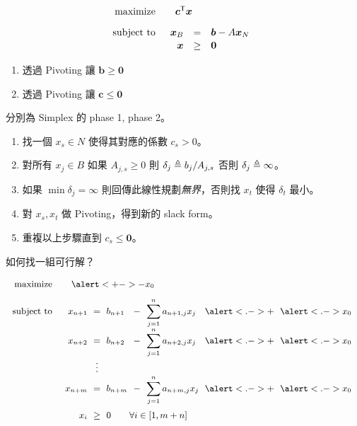 \documentclass[standalone]{beamer}
\begin{document}
\begin{frame}{}
\[
\linearprog{\bm{c}^\mathsf{T} \bm{x}}{
  \begin{array}[t]{rcl}
    \bm{x}_B & = & \bm{b} - A \bm{x}_N \\
    \bm{x}  & \geq & \bm{0}
  \end{array}
}
\]
\pause
\begin{enumerate}[<+->]
  \item 透過 Pivoting 讓 $\bm{b} \geq \bm{0}$
  \item 透過 Pivoting 讓 $\bm{c} \leq \bm{0}$
\end{enumerate}

\onslide<+->
分別為 Simplex 的 phase 1, phase 2。
\end{frame}

\begin{frame}{}
\begin{enumerate}[<+->]
  \itemsep=1ex
  \item 找一個 $x_s \in N$ 使得其對應的係數 $c_s > 0$。
  \item 對所有 $x_j \in B$ 如果 $A_{j, s} \geq 0$ 則 $\delta_j \triangleq b_j / A_{j, s}$ 否則 $\delta_j \triangleq \infty$。
  \item 如果 $\min \delta_j = \infty$ 則回傳此線性規劃\emph{無界}，否則找 $x_t$ 使得 $\delta_t$ 最小。
  \item 對 $x_s, x_t$ 做 Pivoting，得到新的 slack form。
  \item 重複以上步驟直到 $c_s \leq \bm{0}$。
\end{enumerate}
\bigskip

\end{frame}

\begin{frame}{}
  如何找一組可行解？
  \pause

  \[
    \small
    \linearprog{\alert<+->{- x_0}}{
    \arraycolsep=3pt
    \begin{array}[t]{rc>{\displaystyle}lc>{\displaystyle}lcl}
      x_{n+1} & = & b_{n+1} &-& \sum_{j=1}^n a_{n+1, j} x_j &\alert<.->{+}& \alert<.->{x_0}\\
      x_{n+2} & = & b_{n+2} &-& \sum_{j=1}^n a_{n+2, j} x_j &\alert<.->{+}& \alert<.->{x_0}\\
              & \vdots     &                            \\
      x_{n+m} & = & b_{n+m} &-& \sum_{j=1}^n a_{n+m, j} x_j &\alert<.->{+}& \alert<.->{x_0}\\[15pt]
      x_i & \geq & \multicolumn{3}{l}{0 \quad\quad \forall i \in [1, m+n]} \\
    \end{array}
    }
  \]
\end{frame}
\end{document}
